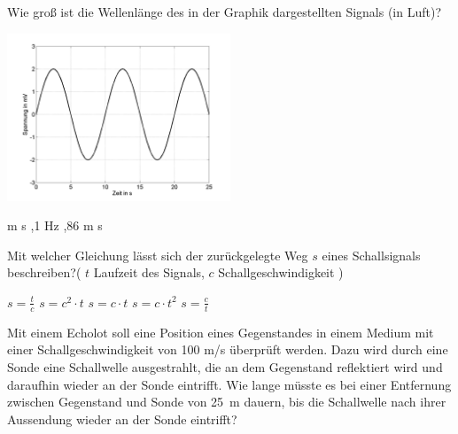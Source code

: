 \documentclass[11pt]{exam}
\begin{document}
\setlength{\voffset}{-0.5in}
\setlength{\headsep}{5pt}

\hspace{2mm}
 \hspace{5mm}
\vspace{4mm}

\begin{questions}

\question Wie groß ist die Wellenlänge des in der Graphik dargestellten Signals (in Luft)? 

\includegraphics[width=0.5\textwidth]{../../../questions/J/images/SchallSinus1.png}

\begin{choices}
	 m
	 s
	,1 Hz
	,86 m
	 s
\end{choices}

\vspace{3mm}\question Mit welcher Gleichung lässt sich der zurückgelegte Weg \( s \) eines Schallsignals beschreiben?( \( t \) Laufzeit des Signals, \( c \) Schallgeschwindigkeit )

\begin{choices}
	\choice \( s= \frac{t}{c} \)
	\choice \( s=c^2 \cdot t \)
	\choice \( s=c \cdot t \)
	\choice \( s = c \cdot t^2 \)
	\choice \( s= \frac{c}{t} \)
\end{choices}

\vspace{3mm}\question Mit einem Echolot soll eine Position eines Gegenstandes in einem Medium mit einer Schallgeschwindigkeit von 100 m/s überprüft werden. Dazu wird durch eine Sonde eine Schallwelle ausgestrahlt, die an dem Gegenstand reflektiert wird und daraufhin wieder an der Sonde eintrifft. Wie lange müsste es bei einer Entfernung zwischen Gegenstand und Sonde von 25~m dauern, bis die Schallwelle nach ihrer Aussendung wieder an der Sonde eintrifft?


\end{questions}
\end{document}
